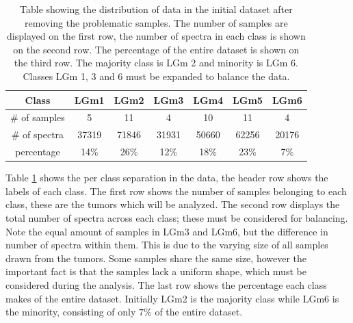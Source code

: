 \begin{table}[htb]
\centering
 \begin{tabular}{||c c c c c c c||} 
 \hline
 Class & LGm1 & LGm2 & LGm3 & LGm4 & LGm5 & LGm6 \\ [0.5ex] 
 \hline\hline
 \# of samples & 5& 11 & 4 & 10 & 11 & 4 \\ 
 \hline
 \# of spectra & 37319 & 71846 & 31931 & 50660 & 62256 & 20176 \\
 \hline
 percentage & 14\%& 26\% & 12\% & 18\% & 23\% & 7\% \\
 \hline

\end{tabular}
\caption{Table showing the distribution of data in the initial dataset after removing the problematic samples. The number of samples are displayed on the first row, the number of spectra in each class is shown on the second row. The percentage of the entire dataset is shown on the third row. The majority class is LGm 2 and minority is LGm 6.  Classes LGm 1, 3 and 6 must be expanded to balance the data.}
\label{table:1}
\end{table}

Table \ref{table:1} shows the per class separation in the data, the header row shows the labels of each class. The first row shows the number of samples belonging to each class, these are the tumors which will be analyzed. The second row displays the total number of spectra across each class; these must be considered for balancing. Note the equal amount of samples in LGm3 and LGm6, but the difference in number of spectra within them. This is due to the varying size of all samples drawn from the tumors. Some samples share the same size, however the important fact is that the samples lack a uniform shape, which must be considered during the analysis. The last row shows the percentage each class makes of the entire dataset. Initially LGm2 is the majority class while LGm6 is the minority, consisting of only $7$\% of the entire dataset.

